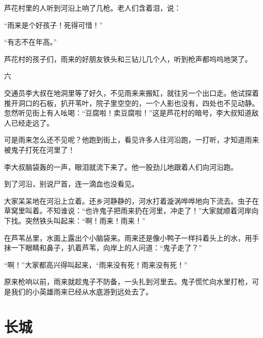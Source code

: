 \documentclass[12pt,UTF-8,openany]{ctexbook}
\begin{document}
\begin{large}
    芦花村里的人听到河沿上响了几枪。老人们含着泪，说：
    
    “雨来是个好孩子！死得可惜！”
    
    “有志不在年高。”
    
    芦花村的孩子们，雨来的好朋友铁头和三钻儿几个人，听到枪声都呜呜地哭了。
    
    六
    
    交通员李大叔在地洞里等了好久，不见雨来来搬缸，就往另一个出口走。他试探着推开洞口的石板，扒开苇叶，院子里空空的，一个人影也没有，四处也不见动静。忽然听见街上有人吆喝：“豆腐啦！卖豆腐啦！”这是芦花村的暗号，李大叔知道敌人已经走远了。
    
    可是雨来怎么还不见呢？他跑到街上，看见许多人往河沿跑，一打听，才知道雨来被鬼子打死在河里了！
    
    李大叔脑袋轰的一声，眼泪就流下来了。他一股劲儿地跟着人们向河沿跑。
    
    到了河沿，别说尸首，连一滴血也没看见。
    
    大家呆呆地在河沿上立着。还乡河静静的，河水打着漩涡哗哗地向下流去。虫子在草窝里叫着。不知谁说：“也许鬼子把雨来扔在河里，冲走了！”大家就顺着河岸向下找。突然铁头叫起来：“啊！雨来！雨来！”
    
    在芦苇丛里，水面上露出个小脑袋来。雨来还是像小鸭子一样抖着头上的水，用手抹一下眼睛和鼻子，扒着芦苇，向岸上的人问道：“鬼子走了？”
    
    “啊！”大家都高兴得叫起来，“雨来没有死！雨来没有死！”
    
    原来枪响以前，雨来就趁鬼子不防备，一头扎到河里去。鬼子慌忙向水里打枪，可是我们的小英雄雨来已经从水底游到远处去了。
    
\end{large}



\chapter{长城}
\end{document}
